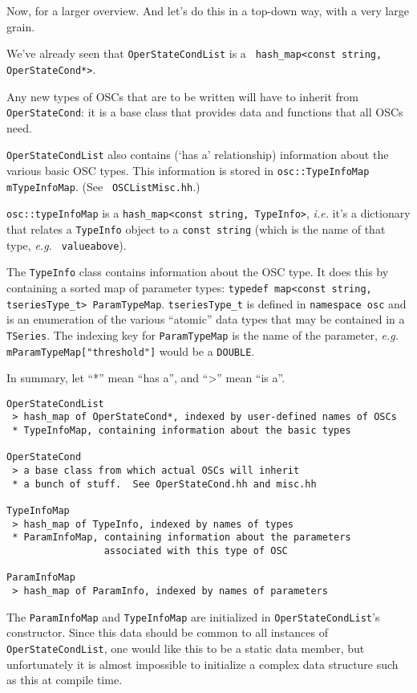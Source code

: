 {Now, for a larger overview.  And let's do this in a top-down way, with
a very large grain.

We've already seen that \texttt{OperStateCondList} is a \texttt{
hash\_map<const string, OperStateCond*>}.

Any new types of OSCs that are to be written will have to inherit from
\texttt{OperStateCond}: it is a base class that provides data and
functions that all OSCs need.

\texttt{OperStateCondList} also contains (`has a' relationship)
information about the various basic OSC types.  This information is
stored in \texttt{osc::TypeInfoMap mTypeInfoMap}.  (See \texttt{
OSCListMisc.hh}.)

\texttt{osc::typeInfoMap} is a \texttt{hash\_map<const string, TypeInfo>},
\textit{i.e.}  it's a dictionary that relates a \texttt{TypeInfo} object to
a \texttt{const string} (which is the name of that type, \textit{e.g.} \texttt{
valueabove}).

The \texttt{TypeInfo} class contains information about the OSC type.
It does this by containing a sorted map of parameter types:
\texttt{typedef map<const string, tseriesType\_t> ParamTypeMap}.
\texttt{tseriesType\_t} is defined in \texttt{namespace osc} and is
an enumeration of the various ``atomic'' data types that may be
contained in a \texttt{TSeries}.  The indexing key for
\texttt{ParamTypeMap} is the name of the parameter, \textit{e.g.}
\texttt{mParamTypeMap["threshold"]} would be a \texttt{DOUBLE}.

In summary, let ``*'' mean ``has a'', and ``>'' mean ``is a''.

\begin{verbatim}
OperStateCondList
 > hash_map of OperStateCond*, indexed by user-defined names of OSCs
 * TypeInfoMap, containing information about the basic types

OperStateCond
 > a base class from which actual OSCs will inherit
 * a bunch of stuff.  See OperStateCond.hh and misc.hh

TypeInfoMap 
 > hash_map of TypeInfo, indexed by names of types
 * ParamInfoMap, containing information about the parameters
                 associated with this type of OSC

ParamInfoMap 
 > hash_map of ParamInfo, indexed by names of parameters

\end{verbatim}

The \texttt{ParamInfoMap} and \texttt{TypeInfoMap} are initialized in 
\texttt{OperStateCondList}'s constructor.  Since this data should be common
to all instances of \texttt{OperStateCondList}, one would like this to be
a static data member, but unfortunately it is almost impossible to
initialize a complex data structure such as this at compile time.

}
